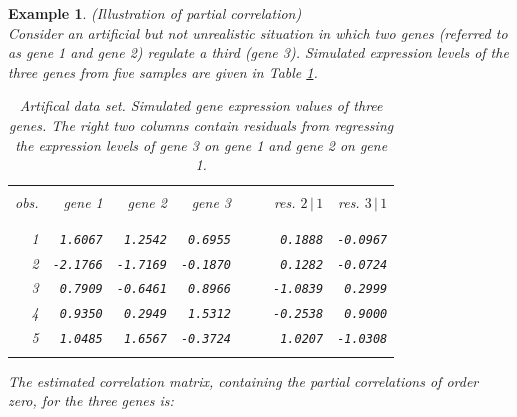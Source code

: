 \documentclass[a4paper]{article}
\theoremstyle{myexamplestyle}
\newtheorem{example}{Example}
\begin{document}
\begin{example} \textit{(Illustration of partial correlation)}
\\
Consider an artificial but not unrealistic situation in which two genes (referred to as gene 1 and gene 2) regulate a third (gene 3). Simulated expression levels of the three genes from five samples are given in Table \ref{tab.artData.3genes}. 
\begin{center}
\begin{table}[!h]
\hfill{}
\begin{tabular}{rrrrrrrr}
\hline \hline
\vspace{-0.1cm}
	&		&		&		&	&	&		&			\\
\vspace{-0.3cm}
\textit{obs.}	&	\textit{gene 1} 	&	\textit{gene 2} 	&	\textit{gene 3}	 &	&	&	\textit{res.} $2 \, | \, 1$	&	\textit{res.} $3 \, | \, 1$  	\\
	&		&		&		&	&	&		&			\\
\hline
\vspace{-0.3cm}
	&		&		&		&	&	&		&			\\
1	&	\texttt{1.6067}	&   \texttt{1.2542}	&	\texttt{0.6955}	&	&	&	\texttt{0.1888}	&	\texttt{-0.0967} 	\\
2	& \texttt{-2.1766} 	&  \texttt{-1.7169} 	&	\texttt{-0.1870}	&	&	&	 \texttt{0.1282}	 &	\texttt{-0.0724}	\\
3	&	\texttt{0.7909}	&  \texttt{-0.6461} 	&	\texttt{0.8966}	&	&	&	\texttt{-1.0839}	 &	\texttt{0.2999}	\\
4	&	\texttt{0.9350}	&	\texttt{0.2949}	&	\texttt{1.5312}	 &	&	&	\texttt{-0.2538}	 &	 \texttt{0.9000} 	\\
5	&	\texttt{1.0485}	&	\texttt{1.6567} 	&	\texttt{-0.3724} 	&	&	&	 \texttt{1.0207}	 &	\texttt{-1.0308} 	\\
\vspace{-0.3cm}
	&		&		&		&	&	&		&			\\
\hline
\end{tabular}
\hfill{}
\caption{Artifical data set. Simulated gene expression values of three genes. The right two columns contain residuals from regressing the expression levels of gene 3 on gene 1 and gene 2 on gene 1.}
\label{tab.artData.3genes}
\end{table}
\end{center}
The estimated correlation matrix, containing the partial correlations of order zero, for the three genes is:
\begin{eqnarray*}

\end{eqnarray*}
\end{example}
\end{document}
